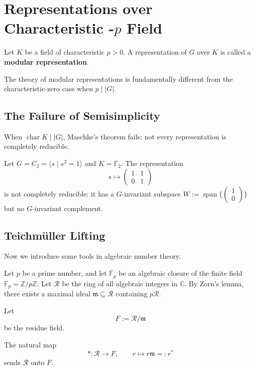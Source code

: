 
\chapter{Representations over Characteristic -\(p\) Field}

\begin{defn}
Let \(K\) be a field of characteristic \(p > 0\). A representation of \(G\) over \(K\) is called a \textbf{modular representation}. 
\end{defn}
The theory of modular representations is fundamentally different from the characteristic-zero case when \(p \mid |G|\).

\section{The Failure of Semisimplicity}

When \(\operatorname{char} K \mid |G|\), Maschke's theorem fails: not every representation is completely reducible.

\begin{exmp}
Let \(G = C_2 = \langle s \mid s^2 = 1 \rangle\) and \(K = \mathbb{F}_2\). The representation
\[
s \mapsto \begin{pmatrix} 1 & 1 \\ 0 & 1 \end{pmatrix}
\]
is not completely reducible: it has a $G$-invariant subspace $W:=\operatorname{span}\{\begin{pmatrix} 1 \\ 0 \end{pmatrix}\}$ but no $G$-invariant complement.
\end{exmp}


\section{Teichm\"uller Lifting}

Now we introduce some tools in algebraic number theory.

Let \(p\) be a prime number, and let \(\overline{\mathbb{F}}_p\) be an algebraic closure of the finite field \(\mathbb{F}_p = \mathbb{Z}/p\mathbb{Z}\). Let \(\mathcal{R}\) be the ring of all algebraic integers in \(\mathbb{C}\). By Zorn's lemma, there exists a maximal ideal \(\mathfrak{m} \subseteq \mathcal{R}\) containing \(p\mathcal{R}\).

Let
\[
F := \mathcal{R}/\mathfrak{m}
\]
be the residue field. 

The natural map
\[
* : \mathcal{R} \to F, \qquad r \mapsto r\mathfrak{m}=:r^*
\]
sends \(\mathcal{R}\) onto \(F\).

